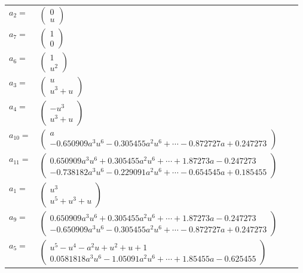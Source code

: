 \documentclass[1p]{elsarticle_modified}
\theoremstyle{definition}
\begin{document}
\begin{tabular}{m{7pt} m{180pt} m{7pt} m{180pt} }
\flushright $a_{2}=$&$\begin{pmatrix}0\\u\end{pmatrix}$ \\
\flushright $a_{7}=$&$\begin{pmatrix}1\\0\end{pmatrix}$ \\
\flushright $a_{6}=$&$\begin{pmatrix}1\\u^2\end{pmatrix}$ \\
\flushright $a_{3}=$&$\begin{pmatrix}u\\u^3+u\end{pmatrix}$ \\
\flushright $a_{4}=$&$\begin{pmatrix}- u^3\\u^3+u\end{pmatrix}$ \\
\flushright $a_{10}=$&$\begin{pmatrix}a\\-0.650909 a^{3} u^{6}-0.305455 a^{2} u^{6}+\cdots-0.872727 a+0.247273\end{pmatrix}$ \\
\flushright $a_{11}=$&$\begin{pmatrix}0.650909 a^{3} u^{6}+0.305455 a^{2} u^{6}+\cdots+1.87273 a-0.247273\\-0.738182 a^{3} u^{6}-0.229091 a^{2} u^{6}+\cdots-0.654545 a+0.185455\end{pmatrix}$ \\
\flushright $a_{1}=$&$\begin{pmatrix}u^3\\u^5+u^3+u\end{pmatrix}$ \\
\flushright $a_{9}=$&$\begin{pmatrix}0.650909 a^{3} u^{6}+0.305455 a^{2} u^{6}+\cdots+1.87273 a-0.247273\\-0.650909 a^{3} u^{6}-0.305455 a^{2} u^{6}+\cdots-0.872727 a+0.247273\end{pmatrix}$ \\
\flushright $a_{5}=$&$\begin{pmatrix}u^5- u^4- a^2 u+u^2+u+1\\0.0581818 a^{3} u^{6}-1.05091 a^{2} u^{6}+\cdots+1.85455 a-0.625455\end{pmatrix}$ \\

\end{tabular}
\end{document}
